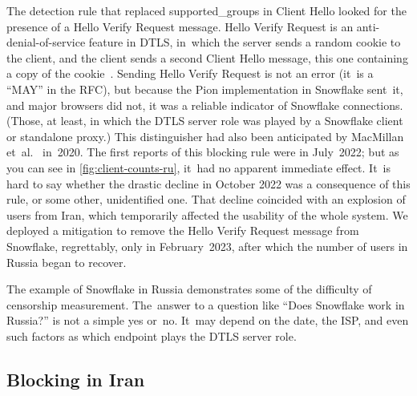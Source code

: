 \documentclass[letterpaper,twocolumn]{article}
\begin{document}
The detection rule that replaced \mbox{supported\_groups} in Client Hello
looked for the presence of a Hello Verify Request message.
Hello Verify Request is an anti-denial-of-service feature in DTLS,
in~which the server sends a random cookie to the client,
and the client sends a second Client Hello message,
this one containing a copy of the cookie~\cite[\S 5.1]{rfc9147}.
Sending Hello Verify Request is not an error
(it~is a ``MAY'' in the RFC),
but because the Pion implementation in Snowflake sent~it,
and major browsers did not,
it was a reliable indicator of Snowflake connections.
(Those, at least, in which the DTLS server role was played by
a Snowflake client or standalone proxy.)
This distinguisher had also been anticipated by
MacMillan et~al.~\cite[\S 3]{arxiv.2008.03254} in~2020.
The first reports of this blocking rule were in July~2022;
but as you can see in \autoref{fig:client-counts-ru},
it~had no apparent immediate effect.
It~is hard to say whether the drastic decline in October 2022
was a consequence of this rule,
or some other, unidentified one.
That decline coincided with an explosion of users from Iran,
which temporarily affected the usability of the whole system.
We deployed a mitigation to remove the Hello Verify Request message
from Snowflake, regrettably, only in February~2023, %
after which the number of users in Russia began to recover.

The example of Snowflake in Russia
demonstrates some of the difficulty of censorship measurement.
The~answer to a question like ``Does Snowflake work in Russia?''
is not a simple yes or~no.
It~may depend on the date, the ISP,
and even such factors as which endpoint plays the DTLS server role.

\subsection{Blocking in Iran}
\label{sec:block-ir}

\end{document}
